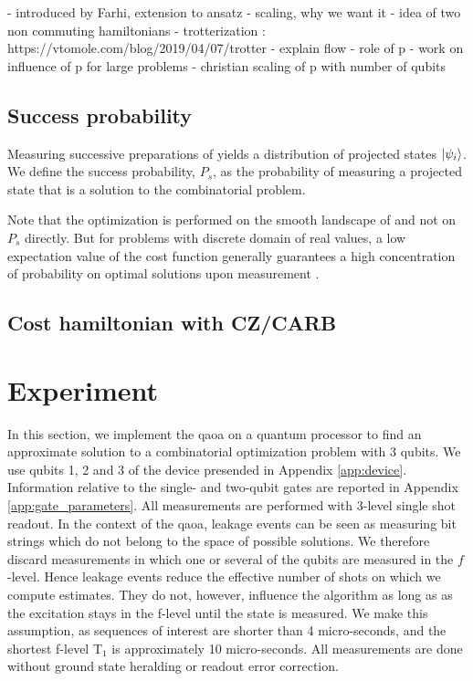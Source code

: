 - introduced by Farhi, extension to ansatz
- scaling, why we want it
- idea of two non commuting hamiltonians
- trotterization : https://vtomole.com/blog/2019/04/07/trotter 
- explain flow
- role of p
- work on influence of p for large problems
- christian scaling of p with number of qubits

\subsection{Success probability}
Measuring successive preparations of \optimalstate yields a distribution of projected states $\ket{\psi_i}$.
We define the success probability, $P_s$, as the probability of measuring a projected state that is a solution to the combinatorial problem. 

Note that the optimization is performed on the smooth landscape of \cost{} and not on $P_s$ directly. But for problems with discrete domain of real values, a low expectation value of the cost function generally guarantees a high concentration of probability on optimal solutions upon measurement \cite{Cook2019TheCover, Wang2019XY-mixers:QAOA}.

\subsection{Cost hamiltonian with CZ/CARB}



\section{Experiment}
In this section, we implement the \gls{qaoa} on a quantum processor to find an approximate solution to a combinatorial optimization problem with 3 qubits. We use qubits 1, 2 and 3 of the device presended in Appendix \ref{app:device}. Information relative to the single- and two-qubit gates are reported in Appendix \ref{app:gate_parameters}. All measurements are performed with 3-level single shot readout. In the context of the \gls{qaoa}, leakage events can be seen as measuring bit strings which do not belong to the space of possible solutions. We therefore discard measurements in which one or several of the qubits are measured in the $f$-level. Hence leakage events reduce the effective number of shots on which we compute estimates. They do not, however, influence the algorithm as long as as the excitation stays in the f-level until the state is measured. We make this assumption, as sequences of interest are shorter than 4 micro-seconds, and the shortest f-level T$_1$ is approximately 10 micro-seconds. All measurements are done without ground state heralding or readout error correction.

